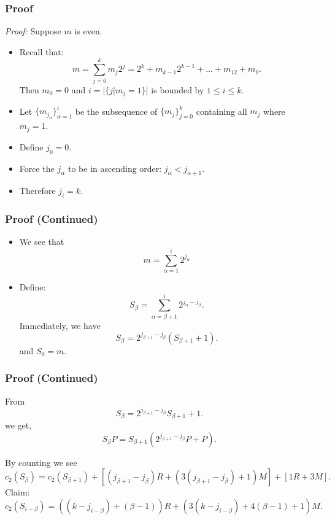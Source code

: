 \documentclass[xcolor=pdftex,dvipsnames,table]{beamer}
\theoremstyle{plain}
\theoremstyle{definition}
\newcommand{\set}[1]{\lbrace #1 \rbrace}
\newcommand{\paren}[1]{\left( #1 \right)}
\newcommand{\brac}[1]{\left[ #1 \right]}
\begin{document}
\begin{frame}
	\frametitle{Proof}
	
	\textit{Proof:} Suppose $m$ is even.
	\begin{itemize}
	\item Recall that:
	\[
	m=\sum_{j=0}^k m_j2^j=2^k+m_{k-1}2^{k-1}+\ldots +m_12+m_0.
	\]
	Then $m_0=0$ and $i=|\set{j|m_j=1}|$ is bounded by $1\leq i\leq k$.
	
	\item Let $\set{m_{j_\alpha}}_{\alpha=1}^i$ be the subsequence of $\set{m_j}_{j=0}^k$ containing all $m_j$ where $m_j=1$.
	
	\item Define $j_0=0$.
	
	\item Force the $j_\alpha$ to be in ascending order: $j_\alpha < j_{\alpha+1}$.
	
	\item Therefore $j_i=k$.
	\end{itemize}
\end{frame}

\begin{frame}
	\frametitle{Proof (Continued)}
	
	\begin{itemize}
		\item We see that
		\[
		m=\sum_{\alpha=1}^{i}2^{j_\alpha}
		\]
		
		\item Define:
		\begin{equation}\label{recursion}
			S_\beta = \sum_{\alpha=\beta+1}^{i} 2^{j_\alpha -j_\beta}.
		\end{equation}
		Immediately, we have
		\begin{equation}\label{revRecursion}
			S_\beta = 2^{j_{\beta+1}-j_\beta} (S_{\beta+1}+1).
		\end{equation}
		and	$S_0=m$. 
	\end{itemize}
\end{frame}

\begin{frame}
	\frametitle{Proof (Continued)}
	
	From
	\[
	S_\beta = 2^{j_{\beta+1}-j_\beta} S_{\beta+1} +1.
	\]
	we get,
	\[
	S_\beta P = S_{\beta+1}\paren{2^{j_{\beta+1}-j_\beta}P  +P}.
	\]
	
	By counting we see
	\[
	c_2(S_\beta)=c_2(S_{\beta+1})+ \brac{(j_{\beta+1}-j_\beta)R + (3(j_{\beta+1}-j_\beta)+1)M}+\brac{1R+3M}.
	\]
	Claim:
	\[
	c_2(S_{i-\beta})=( (k-j_{i-\beta})+ (\beta -1) )R+(3( k-j_{i-\beta} )+4(\beta-1)+1 )M. 
	\]
\end{frame}
\end{document}

